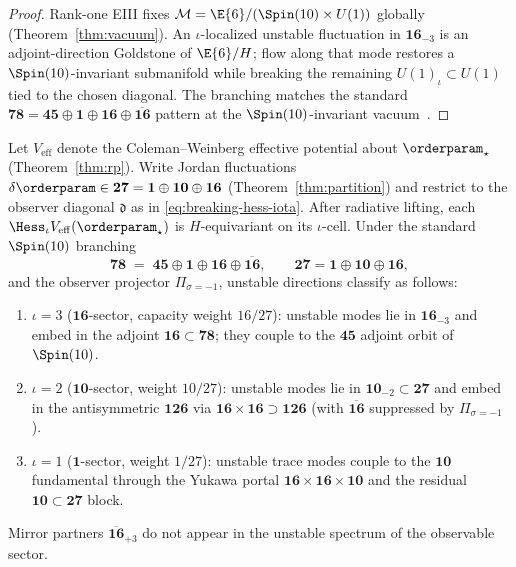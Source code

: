 \begin{proof}
Rank-one EIII fixes $\mathcal{M}=\E{6}/(\Spin(10)\times U(1))$ globally
(Theorem~\ref{thm:vacuum}). An $\iota$-localized unstable fluctuation in
$\mathbf{16}_{-3}$ is an adjoint-direction Goldstone of $\E{6}/H$; flow along
that mode restores a $\Spin(10)$-invariant submanifold while breaking the
remaining $U(1)_\iota\subset U(1)$ tied to the chosen diagonal. The branching
matches the standard
$\mathbf{78}=\mathbf{45}\oplus\mathbf{1}\oplus\mathbf{16}\oplus\overline{\mathbf{16}}$
pattern at the $\Spin(10)$-invariant vacuum~\cite{Witten1985,GeorgiGlashow1974}.
\end{proof}

\begin{lemma}
\label{lem:breaking-hess-spin10}
Let $V_{\mathrm{eff}}$ denote the Coleman--Weinberg effective potential about
$\orderparam_\star$ (Theorem~\ref{thm:rp}). Write Jordan fluctuations
$\delta\orderparam\in\mathbf{27}=\mathbf{1}\oplus\mathbf{10}\oplus\mathbf{16}$
(Theorem~\ref{thm:partition}) and restrict to the observer diagonal
$\mathfrak{d}$ as in \eqref{eq:breaking-hess-iota}. After radiative lifting,
each $\Hess_\iota V_{\mathrm{eff}}(\orderparam_\star)$ is
$H$-equivariant on its $\iota$-cell. Under the standard $\Spin(10)$ branching
\begin{equation}\label{eq:breaking-adjoint-branch}
  \mathbf{78}
  \;=\;
  \mathbf{45}\oplus\mathbf{1}\oplus\mathbf{16}\oplus\overline{\mathbf{16}},
  \qquad
  \mathbf{27}=\mathbf{1}\oplus\mathbf{10}\oplus\mathbf{16},
\end{equation}
and the observer projector $\Pi_{\sigma=-1}$, unstable directions classify as
follows:
\begin{enumerate}[label=(\roman*),leftmargin=*]
  \item $\iota=3$ ($\mathbf{16}$-sector, capacity weight $16/27$): unstable
    modes lie in $\mathbf{16}_{-3}$ and embed in the adjoint
    $\mathbf{16}\subset\mathbf{78}$; they couple to the $\mathbf{45}$ adjoint
    orbit of $\Spin(10)$.
  \item $\iota=2$ ($\mathbf{10}$-sector, weight $10/27$): unstable modes lie in
    $\mathbf{10}_{-2}\subset\mathbf{27}$ and embed in the antisymmetric
    $\mathbf{126}$ via $\mathbf{16}\times\mathbf{16}\supset\mathbf{126}$
    (with $\overline{\mathbf{16}}$ suppressed by $\Pi_{\sigma=-1}$).
  \item $\iota=1$ ($\mathbf{1}$-sector, weight $1/27$): unstable trace modes
    couple to the $\mathbf{10}$ fundamental through the Yukawa portal
    $\mathbf{16}\times\mathbf{16}\times\mathbf{10}$ and the residual
    $\mathbf{10}\subset\mathbf{27}$ block.
\end{enumerate}
Mirror partners $\overline{\mathbf{16}}_{+3}$ do not appear in the unstable
spectrum of the observable sector.
\end{lemma}

